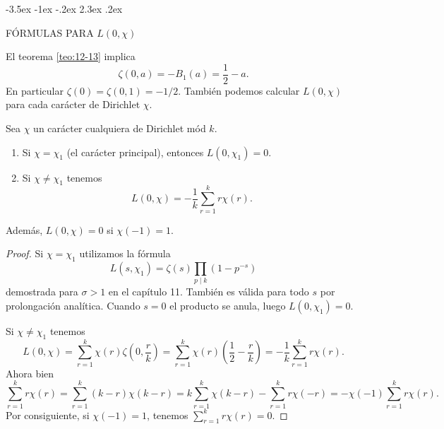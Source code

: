 \documentclass[12pt,a4paper]{book}
\makeatletter
\renewcommand\section{\@startsection{section}{1}{\z@}%
  {-3.5ex \@plus -1ex \@minus -.2ex}%
  {2.3ex \@plus .2ex}%
  {\normalfont\Large\bfseries\raggedright}}
\makeatother
\begin{document}
    \section{FÓRMULAS PARA \texorpdfstring{$L(0,\chi)$}{L(0,χ)}}

    El teorema \ref{teo:12-13} implica
    \begin{equation*}
        \zeta(0,a)=-B_{1}(a)=\frac{1}{2}-a.
    \end{equation*}
    En particular $\zeta(0)=\zeta(0,1)=-1/2$. También podemos calcular $L(0,\chi)$ para cada
    carácter de Dirichlet $\chi$.

    \begin{teorema}\label{teo:12-20}
        Sea $\chi$ un carácter cualquiera de Dirichlet mód $k$.
        \begin{enumerate}
            \item[(a)] Si $\chi=\chi_{1}$ (el carácter principal), entonces $L(0,\chi_{1})=0$.
            \item[(b)] Si $\chi\neq\chi_{1}$ tenemos
            \begin{equation*}
                L(0,\chi)=-\frac{1}{k}\sum_{r=1}^{k}r\chi(r).
            \end{equation*}
        \end{enumerate}
        Además, $L(0,\chi)=0$ si $\chi(-1)=1$.
    \end{teorema}

    \begin{proof}
        Si $\chi=\chi_{1}$ utilizamos la fórmula
        \begin{equation*}
            L(s,\chi_{1})=\zeta(s)\prod_{p\mid k}(1-p^{-s})
        \end{equation*}
        demostrada para $\sigma>1$ en el capítulo 11. También es válida para todo $s$ por
        prolongación analítica. Cuando $s=0$ el producto se anula, luego $L(0,\chi_{1})=0$.

        Si $\chi\neq\chi_{1}$ tenemos
        \begin{equation*}
            L(0,\chi)=\sum_{r=1}^{k}\chi(r)\zeta\left(0,\frac{r}{k}\right)=\sum_{r=1}^{k}\chi(r)\left(\frac{1}{2}-\frac{r}{k}\right)=-\frac{1}{k}\sum_{r=1}^{k}r\chi(r).
        \end{equation*}
        Ahora bien
        \begin{equation*}
            \sum_{r=1}^{k}r\chi(r)=\sum_{r=1}^{k}(k-r)\chi(k-r)=k\sum_{r=1}^{k}\chi(k-r)-\sum_{r=1}^{k}r\chi(-r)=-\chi(-1)\sum_{r=1}^{k}r\chi(r).
        \end{equation*}
        Por consiguiente, si $\chi(-1)=1$, tenemos $\sum_{r=1}^{k}r\chi(r)=0$.
    \end{proof}
\end{document}
